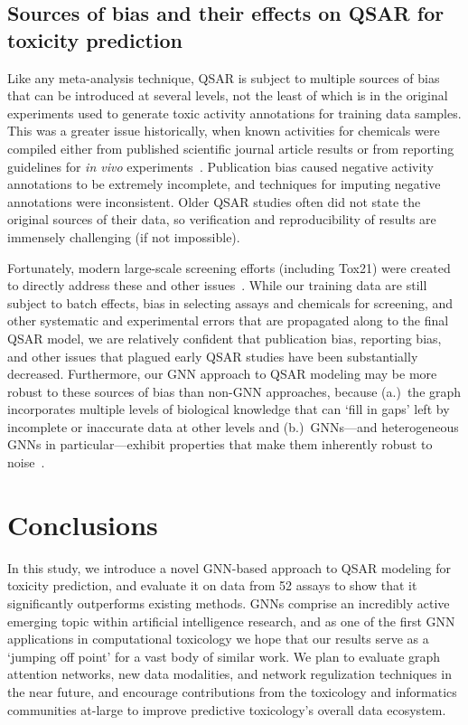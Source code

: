 \documentclass{ws-procs11x85}
\begin{document}
\subsection{Sources of bias and their effects on QSAR for toxicity prediction}
Like any meta-analysis technique, QSAR is subject to multiple sources of bias that can be introduced at several levels, not the least of which is in the original experiments used to generate toxic activity annotations for training data samples.
This was a greater issue historically, when known activities for chemicals were compiled either from published scientific journal article results or from reporting guidelines for \textit{in vivo} experiments~\cite{cronin2019identification}.
Publication bias caused negative activity annotations to be extremely incomplete, and techniques for imputing negative annotations were inconsistent.
Older QSAR studies often did not state the original sources of their data, so verification and reproducibility of results are immensely challenging (if not impossible).

Fortunately, modern large-scale screening efforts (including Tox21) were created to directly address these and other issues~\cite{shoichet2004virtual}.
While our training data are still subject to batch effects, bias in selecting assays and chemicals for screening, and other systematic and experimental errors that are propagated along to the final QSAR model, we are relatively confident that publication bias, reporting bias, and other issues that plagued early QSAR studies have been substantially decreased. Furthermore, our GNN approach to QSAR modeling may be more robust to these sources of bias than non-GNN approaches, because (a.)~the graph incorporates multiple levels of biological knowledge that can `fill in gaps' left by incomplete or inaccurate data at other levels and (b.)~GNNs---and heterogeneous GNNs in particular---exhibit properties that make them inherently robust to noise~\cite{xie2020heterogeneous,nt2019revisiting}.
\section{Conclusions}
In this study, we introduce a novel GNN-based approach to QSAR modeling for toxicity prediction, and evaluate it on data from 52 assays to show that it significantly outperforms existing methods.
GNNs comprise an incredibly active emerging topic within artificial intelligence research, and as one of the first GNN applications in computational toxicology we hope that our results serve as a `jumping off point' for a vast body of similar work.
We plan to evaluate graph attention networks, new data modalities, and network regulization techniques in the near future, and encourage contributions from the toxicology and informatics communities at-large to improve predictive toxicology's overall data ecosystem.
\end{document}
